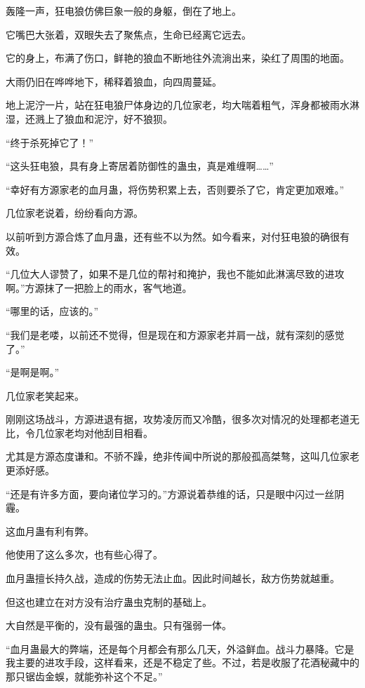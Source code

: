 
\begin{this_body}

轰隆一声，狂电狼仿佛巨象一般的身躯，倒在了地上。

它嘴巴大张着，双眼失去了聚焦点，生命已经离它远去。

它的身上，布满了伤口，鲜艳的狼血不断地往外流淌出来，染红了周围的地面。

大雨仍旧在哗哗地下，稀释着狼血，向四周蔓延。

地上泥泞一片，站在狂电狼尸体身边的几位家老，均大喘着粗气，浑身都被雨水淋湿，还溅上了狼血和泥泞，好不狼狈。

“终于杀死掉它了！”

“这头狂电狼，具有身上寄居着防御性的蛊虫，真是难缠啊……”

“幸好有方源家老的血月蛊，将伤势积累上去，否则要杀了它，肯定更加艰难。”

几位家老说着，纷纷看向方源。

以前听到方源合炼了血月蛊，还有些不以为然。如今看来，对付狂电狼的确很有效。

“几位大人谬赞了，如果不是几位的帮衬和掩护，我也不能如此淋漓尽致的进攻啊。”方源抹了一把脸上的雨水，客气地道。

“哪里的话，应该的。”

“我们是老喽，以前还不觉得，但是现在和方源家老并肩一战，就有深刻的感觉了。”

“是啊是啊。”

几位家老笑起来。

刚刚这场战斗，方源进退有据，攻势凌厉而又冷酷，很多次对情况的处理都老道无比，令几位家老均对他刮目相看。

尤其是方源态度谦和。不骄不躁，绝非传闻中所说的那般孤高桀骜，这叫几位家老更添好感。

“还是有许多方面，要向诸位学习的。”方源说着恭维的话，只是眼中闪过一丝阴霾。

这血月蛊有利有弊。

他使用了这么多次，也有些心得了。

血月蛊擅长持久战，造成的伤势无法止血。因此时间越长，敌方伤势就越重。

但这也建立在对方没有治疗蛊虫克制的基础上。

大自然是平衡的，没有最强的蛊虫。只有强弱一体。

“血月蛊最大的弊端，还是每个月都会有那么几天，外溢鲜血。战斗力暴降。它是我主要的进攻手段，这样看来，还是不稳定了些。不过，若是收服了花酒秘藏中的那只锯齿金蜈，就能弥补这个不足。”


\end{this_body}
